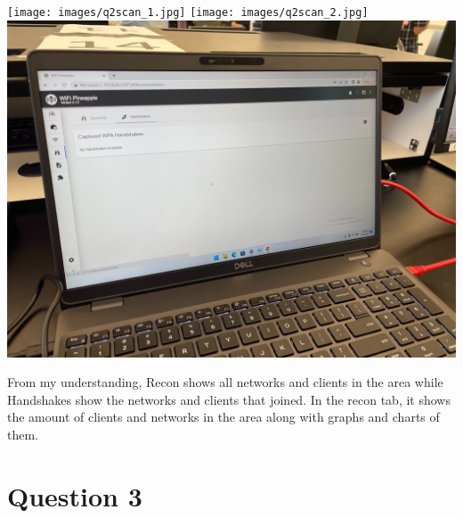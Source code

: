 \documentclass[12pt]{article}
\begin{document}
\begin{center}
    \texttt{[image: images/q2scan\_1.jpg]}
    \texttt{[image: images/q2scan\_2.jpg]}
    \includegraphics[scale=.07]{images/q2_handshake.jpg}
\end{center}

From my understanding, Recon shows all networks and clients in the area while 
Handshakes show the networks and clients that joined. In the recon tab,
it shows the amount of clients and networks in the area along with graphs and charts of them.

\section*{Question 3}
\end{document}
